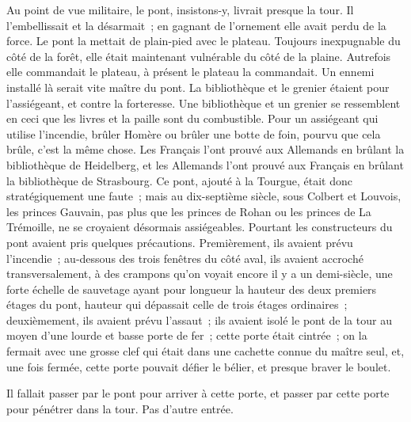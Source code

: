 \documentclass[french,twoside]{book} %
\begin{document}
Au point de vue militaire, le pont, insistons-y, livrait presque la tour. Il l’embellissait et la désarmait ; en gagnant de l’ornement elle avait perdu de la force. Le pont la mettait de plain-pied avec le plateau. Toujours inexpugnable du côté de la forêt, elle était maintenant vulnérable du côté de la plaine. Autrefois elle commandait le plateau, à présent le plateau la commandait. Un ennemi installé là serait vite maître du pont. La bibliothèque et le grenier étaient pour l’assiégeant, et contre la forteresse. Une bibliothèque et un grenier se ressemblent en ceci que les livres et la paille sont du combustible. Pour un assiégeant qui utilise l’incendie, brûler Homère ou brûler une botte de foin, pourvu que cela brûle, c’est la même chose. Les Français l’ont prouvé aux Allemands en brûlant la bibliothèque de Heidelberg, et les Allemands l’ont prouvé aux Français en brûlant la bibliothèque de Strasbourg. Ce pont, ajouté à la Tourgue, était donc stratégiquement une faute ; mais au dix-septième siècle, sous Colbert et Louvois, les princes Gauvain, pas plus que les princes de Rohan ou les princes de La Trémoille, ne se croyaient désormais assiégeables. Pourtant les constructeurs du pont avaient pris quelques précautions. Premièrement, ils avaient prévu l’incendie ;  au-dessous des trois fenêtres du côté aval, ils avaient accroché transversalement, à des crampons qu’on voyait encore il y a un demi-siècle, une forte échelle de sauvetage ayant pour longueur la hauteur des deux premiers étages du pont, hauteur qui dépassait celle de trois étages ordinaires ; deuxièmement, ils avaient prévu l’assaut ; ils avaient isolé le pont de la tour au moyen d’une lourde et basse porte de fer ; cette porte était cintrée ; on la fermait avec une grosse clef qui était dans une cachette connue du maître seul, et, une fois fermée, cette porte pouvait défier le bélier, et presque braver le boulet.\par
Il fallait passer par le pont pour arriver à cette porte, et passer par cette porte pour pénétrer dans la tour. Pas d’autre entrée.
\end{document}
